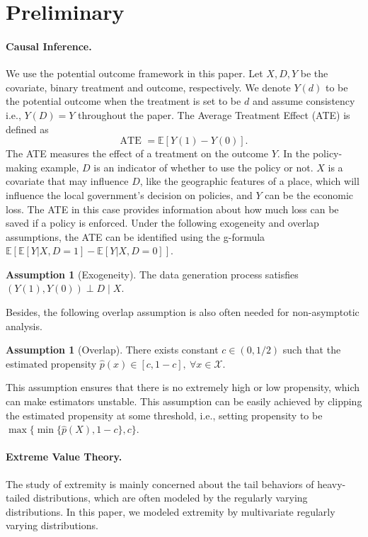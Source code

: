 \documentclass[12pt]{article}
\theoremstyle{plain}
\theoremstyle{definition}
\newtheorem{assumption}[theorem]{Assumption}
\newcommand{\nobracket}{}
\begin{document}
\section{Preliminary} \label{sec:prelin}

\paragraph{Causal Inference.} We use the potential outcome framework \cite{rubin1974estimating} in this paper. Let $X, D, Y$ be the covariate, binary treatment and outcome, respectively. We denote $Y (d)$ to be the potential outcome when the treatment is set to be $d$ and assume consistency i.e., $Y(D) = Y$ throughout the paper. The Average Treatment Effect (ATE) is defined as \[ \text{ATE } =\mathbb{E} [Y (1) - Y (0)]. \]
The ATE measures the effect of a treatment on the outcome $Y$. In the policy-making example, $D$ is an indicator of whether to use the policy or not. $X$ is a covariate that may influence $D$, like the geographic features of a place, which will influence the local government's decision on policies, and $Y$ can be the economic loss. The ATE in this case provides information about how much loss can be saved if a policy is enforced. Under the following exogeneity and overlap assumptions, the ATE can be identified using the g-formula $\mathbb{E} [\mathbb{E} [Y | X, D = 1 \nobracket] -\mathbb{E} [Y | X, D = 0] \nobracket]$.

\begin{assumption} [Exogeneity] \label{assump:exo}
  \label{assump:unconfouding}The data generation process satisfies $(Y (1), Y(0)) \perp D \mid X$. 
\end{assumption}

Besides, the following overlap assumption is
also often needed for non-asymptotic analysis.
\begin{assumption}
  [Overlap]\label{assump:overlap}There exists constant $c \in (0,1/2)$ such that the estimated propensity $\hat{p} (x) \in [c, 1 - c], \  \forall x \in \mathcal{X}$.
\end{assumption}
This assumption ensures that there is no extremely high or low propensity, which can make estimators unstable. This assumption can be easily achieved by clipping the estimated propensity at some threshold, i.e., setting propensity to be $ \max\{\min\{\hat{p}(X), 1 -c\}, c\} $. 

\paragraph{Extreme Value Theory.} The study of extremity is mainly concerned about the tail behaviors of heavy-tailed distributions, which are often modeled by the regularly varying distributions. In this paper, we modeled extremity by multivariate regularly varying distributions. 
\end{document}
